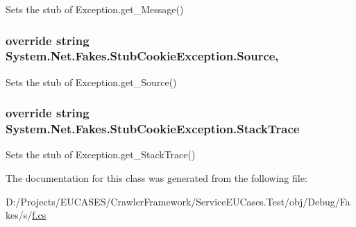 Sets the stub of Exception.\-get\-\_\-\-Message()

\hypertarget{class_system_1_1_net_1_1_fakes_1_1_stub_cookie_exception_a2249e9a36541a49662befb96f94dc097}{
\subsubsection[{Source}]{\setlength{\rightskip}{0pt plus 5cm}override string System.\-Net.\-Fakes.\-Stub\-Cookie\-Exception.\-Source\hspace{0.3cm}{\ttfamily [get]}, {\ttfamily [set]}}}\label{class_system_1_1_net_1_1_fakes_1_1_stub_cookie_exception_a2249e9a36541a49662befb96f94dc097}


Sets the stub of Exception.\-get\-\_\-\-Source()

\hypertarget{class_system_1_1_net_1_1_fakes_1_1_stub_cookie_exception_a3102892539e19c7f02865e2b456dd3a3}{
\subsubsection[{Stack\-Trace}]{\setlength{\rightskip}{0pt plus 5cm}override string System.\-Net.\-Fakes.\-Stub\-Cookie\-Exception.\-Stack\-Trace\hspace{0.3cm}{\ttfamily [get]}}}\label{class_system_1_1_net_1_1_fakes_1_1_stub_cookie_exception_a3102892539e19c7f02865e2b456dd3a3}


Sets the stub of Exception.\-get\-\_\-\-Stack\-Trace()



The documentation for this class was generated from the following file\-:\begin{DoxyCompactItemize}
\item 
D\-:/\-Projects/\-E\-U\-C\-A\-S\-E\-S/\-Crawler\-Framework/\-Service\-E\-U\-Cases.\-Test/obj/\-Debug/\-Fakes/s/\hyperlink{s_2f_8cs}{f.\-cs}\end{DoxyCompactItemize}
